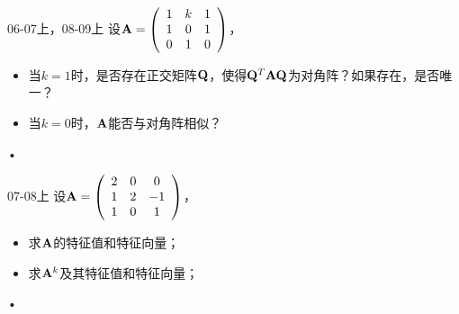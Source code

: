 \begin{frame} 
  \begin{footnotesize}
    \begin{exampleblock}{06-07上，08-09上}     
     设$\mathbf{A}=\left(
\begin{array}{ccc}
1&k&1\\
1&0&1\\
0&1&0
\end{array}
\right)$，
\begin{itemize}
\item 当$k=1$时，是否存在正交矩阵$\mathbf{Q}$，使得$\mathbf{Q}^T\mathbf{A}\mathbf{Q}$为对角阵？如果存在，是否唯一？
\item 当$k=0$时，$\mathbf{A}$能否与对角阵相似？

\end{itemize}•
    \end{exampleblock}


 \begin{exampleblock}{07-08上}     
     设$\mathbf{A}=\left(
\begin{array}{ccc}
2&0&0\\
1&2&-1\\
1&0&1
\end{array}
\right)$，
\begin{itemize}
\item 求$\mathbf{A}$的特征值和特征向量；
\item 求$\mathbf{A}^k$及其特征值和特征向量；
\end{itemize}•
    \end{exampleblock}
  \end{footnotesize}
\end{frame}


